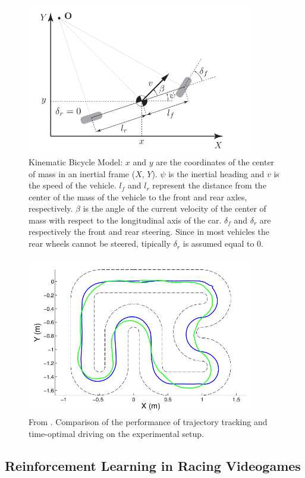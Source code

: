 \begin{figure}
 \centering
  \captionsetup{width=10cm}
  \includegraphics[width=10cm]{./img/bycicle}
  \caption{Kinematic Bicycle Model: $x$ and $y$ are the coordinates of the center of mass in an inertial frame ($X$, $Y$). \(\psi\) is the inertial heading and $v$ is the speed of the vehicle. $l_f$ and $l_r$ represent the distance from the center of the mass of the vehicle to the front and rear axles, respectively. $\beta$ is the angle of the current velocity of the center of mass with respect to the longitudinal axis of the car. $\delta_f$ and $\delta_r$ are respectively the front and rear steering. Since in most vehicles the rear wheels cannot be steered, tipically $\delta_r$ is assumed equal to $0$.}
  \label{fig:bycicle}
\end{figure}
\begin{figure}
 \centering
  \captionsetup{width=10cm}
  \includegraphics[width=10cm]{./img/mpc-comparison}
  \caption{From \cite{mpc}. Comparison of the performance of trajectory tracking and time-optimal driving on the experimental setup.}
	 \label{fig:mpc-comparison}
\end{figure}

\subsection{Reinforcement Learning in Racing Videogames}

